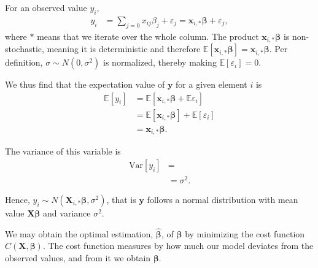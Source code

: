 \documentclass[reprint,english,notitlepage]{revtex4-1}  %
\begin{document}
For an observed value $y_i$, 
\begin{align}
    y_i &= \sum\limits_{j=0} x_{ij}\beta_j + \varepsilon_j %
        = \boldsymbol{x}_{i,*}\boldsymbol{\beta} + \varepsilon_j, 
\end{align}
where $*$ means that we iterate over the whole column. The product $\boldsymbol{x}_{i,*}\boldsymbol{\beta}$ is non-stochastic, meaning it is deterministic and therefore $\mathbb{E}[\boldsymbol{x}_{i,*}\boldsymbol{\beta}] = \boldsymbol{x}_{i,*}\boldsymbol{\beta}$. Per definition, $\sigma\sim N(0,\sigma^2)$ is normalized, thereby making $\mathbb{E}[\varepsilon_i] = 0$. 

We thus find that the expectation value of $\boldsymbol{y}$ for a given element $i$ is 
\begin{align}
    \mathbb{E}[y_i] 
    & = \mathbb{E}[\boldsymbol{x}_{i,*}\boldsymbol{\beta} + \mathbb{E}\varepsilon_i] \nonumber \\ 
    & = \mathbb{E}[\boldsymbol{x}_{i,*}\boldsymbol{\beta}] + \mathbb{E}[\varepsilon_i] \nonumber \\ 
    & = \boldsymbol{x}_{i,*}\boldsymbol{\beta}. 
\end{align}

The variance of this variable is 
\begin{align}
    \text{Var}[y_i] 
    & = \nonumber \\ 
    & = \sigma^2. 
\end{align}

Hence, $y_i\sim N(\mathbf{X}_{i,*}\boldsymbol{\beta}, \sigma^2)$, that is $\boldsymbol{y}$ follows a normal distribution with mean value $\mathbf{X}\boldsymbol{\beta}$ and variance $\sigma^2$. 

We may obtain the optimal estimation, $\hat{\mathbf{\beta}}$, of $\mathbf{\beta}$ by minimizing the cost function $C(\boldsymbol{X}, \mathbf{\beta})$. 
The cost function measures by how much our model deviates from the observed values, and from it we obtain $\mathbf{\beta}$. 
\end{document}
